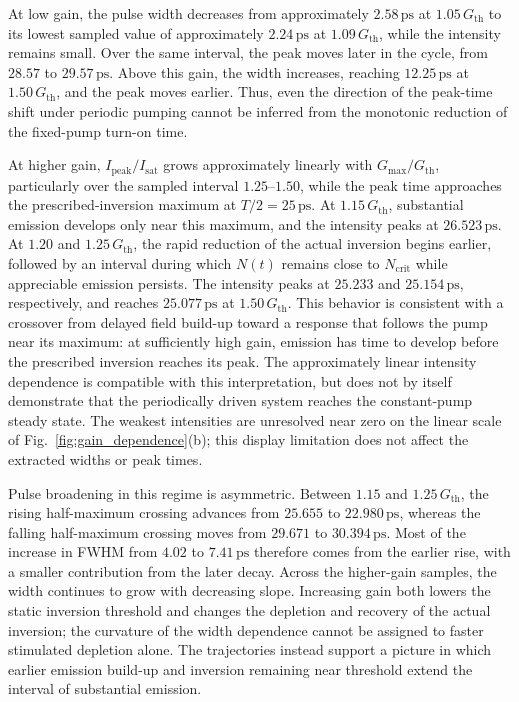 \documentclass{optica-article}
\begin{document}
At low gain, the pulse width decreases from approximately $2.58\,\mathrm{ps}$ at $1.05\,G_{\mathrm{th}}$ to its lowest sampled value of approximately $2.24\,\mathrm{ps}$ at $1.09\,G_{\mathrm{th}}$, while the intensity remains small. Over the same interval, the peak moves later in the cycle, from $28.57$ to $29.57\,\mathrm{ps}$. Above this gain, the width increases, reaching $12.25\,\mathrm{ps}$ at $1.50\,G_{\mathrm{th}}$, and the peak moves earlier. Thus, even the direction of the peak-time shift under periodic pumping cannot be inferred from the monotonic reduction of the fixed-pump turn-on time.

At higher gain, $I_{\mathrm{peak}}/I_{\mathrm{sat}}$ grows approximately linearly with $G_{\max}/G_{\mathrm{th}}$, particularly over the sampled interval $1.25$--$1.50$, while the peak time approaches the prescribed-inversion maximum at $T/2=25\,\mathrm{ps}$. At $1.15\,G_{\mathrm{th}}$, substantial emission develops only near this maximum, and the intensity peaks at $26.523\,\mathrm{ps}$. At $1.20$ and $1.25\,G_{\mathrm{th}}$, the rapid reduction of the actual inversion begins earlier, followed by an interval during which $N(t)$ remains close to $N_{\mathrm{crit}}$ while appreciable emission persists. The intensity peaks at $25.233$ and $25.154\,\mathrm{ps}$, respectively, and reaches $25.077\,\mathrm{ps}$ at $1.50\,G_{\mathrm{th}}$. This behavior is consistent with a crossover from delayed field build-up toward a response that follows the pump near its maximum: at sufficiently high gain, emission has time to develop before the prescribed inversion reaches its peak. The approximately linear intensity dependence is compatible with this interpretation, but does not by itself demonstrate that the periodically driven system reaches the constant-pump steady state. The weakest intensities are unresolved near zero on the linear scale of Fig.~\ref{fig:gain_dependence}(b); this display limitation does not affect the extracted widths or peak times.

Pulse broadening in this regime is asymmetric. Between $1.15$ and $1.25\,G_{\mathrm{th}}$, the rising half-maximum crossing advances from $25.655$ to $22.980\,\mathrm{ps}$, whereas the falling half-maximum crossing moves from $29.671$ to $30.394\,\mathrm{ps}$. Most of the increase in FWHM from $4.02$ to $7.41\,\mathrm{ps}$ therefore comes from the earlier rise, with a smaller contribution from the later decay. Across the higher-gain samples, the width continues to grow with decreasing slope. Increasing gain both lowers the static inversion threshold and changes the depletion and recovery of the actual inversion; the curvature of the width dependence cannot be assigned to faster stimulated depletion alone. The trajectories instead support a picture in which earlier emission build-up and inversion remaining near threshold extend the interval of substantial emission.
\end{document}
